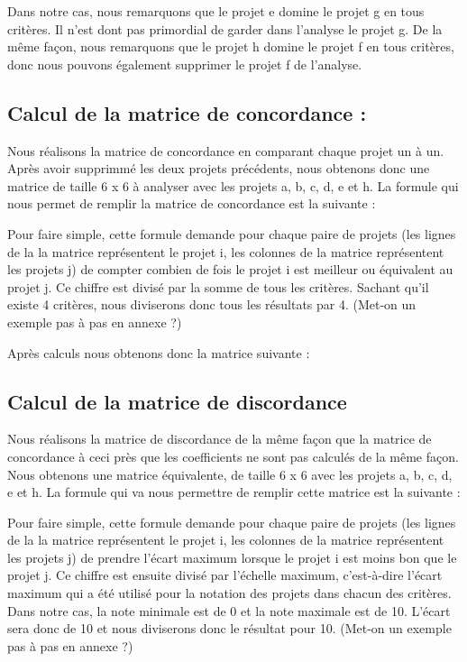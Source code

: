 \documentclass[a4paper,10pt]{article}
\begin{document}
Dans notre cas, nous remarquons que le projet e domine le projet g en tous critères. Il n'est dont pas primordial de garder dans l'analyse le projet g. De la même façon, nous remarquons que le projet h domine le projet f en tous critères, donc nous pouvons également supprimer le projet f de l'analyse.

\subsection{Calcul de la matrice de concordance :}

Nous réalisons la matrice de concordance en comparant chaque projet un à un. Après avoir supprimmé les deux projets précédents, nous obtenons donc une matrice de taille 6 x 6 à analyser avec les projets a, b, c, d, e et h. La formule qui nous permet de remplir la matrice de concordance est la suivante :


Pour faire simple, cette formule demande pour chaque paire de projets (les lignes de la la matrice représentent le projet i, les colonnes de la matrice représentent les projets j) de compter combien de fois le projet i est meilleur ou équivalent au projet j. Ce chiffre est divisé par la somme de tous les critères. Sachant qu'il existe 4 critères, nous diviserons donc tous les résultats par 4. (Met-on un exemple pas à pas en annexe ?) 

Après calculs nous obtenons donc la matrice suivante :


\subsection{Calcul de la matrice de discordance}

Nous réalisons la matrice de discordance de la même façon que la matrice de concordance à ceci près que les coefficients ne sont pas calculés de la même façon. Nous obtenons une matrice équivalente, de taille 6 x 6 avec les projets a, b, c, d, e et h. La formule qui va nous permettre de remplir cette matrice est la suivante :


Pour faire simple, cette formule demande pour chaque paire de projets (les lignes de la la matrice représentent le projet i, les colonnes de la matrice représentent les projets j) de prendre l'écart maximum lorsque le projet i est moins bon que le projet j. Ce chiffre est ensuite divisé par l'échelle maximum, c'est-à-dire l'écart maximum qui a été utilisé pour la notation des projets dans chacun des critères. Dans notre cas, la note minimale est de 0 et la note maximale est de 10. L'écart sera donc de 10 et nous diviserons donc le résultat pour 10. (Met-on un exemple pas à pas en annexe ?)
\end{document}
